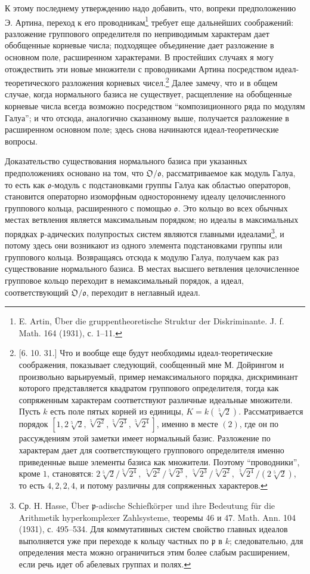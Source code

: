 \documentclass[11pt]{article}
\providecommand{\frakO}{\mathfrak{O}}
\providecommand{\frako}{\mathfrak{o}}
\providecommand{\frakp}{\mathfrak{p}}
\begin{document}
К этому последнему утверждению надо добавить, что, вопреки предположению Э. Артина, переход к его проводникам\footnote{E. Artin, Über die gruppentheoretische Struktur der Diskriminante. J. f. Math. 164 (1931), с. 1--11.} требует еще дальнейших соображений: разложение группового определителя по неприводимым характерам дает обобщенные корневые числа; подходящее объединение дает разложение в основном поле, расширенном характерами. В простейших случаях я могу отождествить эти новые множители с проводниками Артина посредством идеал-теоретического разложения корневых чисел.\footnote{[6. 10. 31.] Что и вообще еще будут необходимы идеал-теоретические соображения, показывает следующий, сообщенный мне М. Дойрингом и произвольно варьируемый, пример немаксимального порядка, дискриминант которого представляется квадратом группового определителя, тогда как сопряженным характерам соответствуют различные идеальные множители. Пусть \(k\) есть поле пятых корней из единицы, \(K=k(\sqrt[5]{2})\). Рассматривается порядок \([1,2\sqrt[5]{2},\sqrt[5]{2^2},\sqrt[5]{2^3},\sqrt[5]{2^4}]\), именно в месте \((2)\), где он по рассуждениям этой заметки имеет нормальный базис. Разложение по характерам дает для соответствующего группового определителя именно приведенные выше элементы базиса как множители. Поэтому ``проводники'', кроме \(1\), становятся: \(2\sqrt[5]{2}/\sqrt[5]{2^4}\), \(\sqrt[5]{2^2}/\sqrt[5]{2^3}\), \(\sqrt[5]{2^3}/\sqrt[5]{2^2}\), \(\sqrt[5]{2^4}/(2\sqrt[5]{2})\), то есть \(4,2,2,4\), и потому различны для сопряженных характеров.} Далее замечу, что и в общем случае, когда нормального базиса не существует, расщепление на обобщенные корневые числа всегда возможно посредством ``композиционного ряда по модулям Галуа''; и что отсюда, аналогично сказанному выше, получается разложение в расширенном основном поле; здесь снова начинаются идеал-теоретические вопросы.

Доказательство существования нормального базиса при указанных предположениях основано на том, что \(\frakO/\frako\), рассматриваемое как модуль Галуа, то есть как \(\frako\)-модуль с подстановками группы Галуа как областью операторов, становится операторно изоморфным одностороннему идеалу целочисленного группового кольца, расширенного с помощью \(\frako\). Это кольцо во всех обычных местах ветвления является максимальным порядком; но идеалы в максимальных порядках \(\frakp\)-адических полупростых систем являются главными идеалами\footnote{Ср. H. Hasse, Über \(\frakp\)-adische Schiefkörper und ihre Bedeutung für die Arithmetik hyperkomplexer Zahlsysteme, теоремы 46 и 47. Math. Ann. 104 (1931), с. 495--534. Для коммутативных систем свойство главных идеалов выполняется уже при переходе к кольцу частных по \(\frakp\) в \(k\); следовательно, для определения места можно ограничиться этим более слабым расширением, если речь идет об абелевых группах и полях.}, и потому здесь они возникают из одного элемента подстановками группы или группового кольца. Возвращаясь отсюда к модулю Галуа, получаем как раз существование нормального базиса. В местах высшего ветвления целочисленное групповое кольцо переходит в немаксимальный порядок, а идеал, соответствующий \(\frakO/\frako\), переходит в неглавный идеал.
\end{document}
